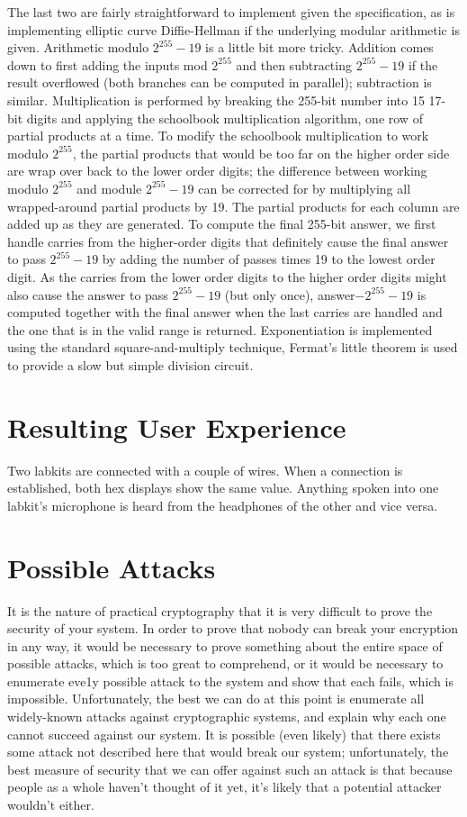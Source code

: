\documentclass[a4paper]{report}
\begin{document}
The last two are fairly straightforward to implement given the specification, as
is implementing elliptic curve Diffie-Hellman if the underlying modular
arithmetic is given. Arithmetic modulo $2^{255}-19$ is a little bit more
tricky. Addition comes down to first adding the inputs mod $2^{255}$ and then
subtracting $2^{255}-19$ if the result overflowed (both branches can be computed
in parallel); subtraction is similar.  Multiplication is performed by breaking
the 255-bit number into 15 17-bit digits and applying the schoolbook
multiplication algorithm, one row of partial products at a time. To modify the
schoolbook multiplication to work modulo $2^{255}$, the partial products that
would be too far on the higher order side are wrap over back to the lower order
digits; the difference between working modulo $2^{255}$ and module $2^{255}-19$
can be corrected for by multiplying all wrapped-around partial products by 19.
The partial products for each column are added up as they are generated. To
compute the final 255-bit answer, we first handle carries from the higher-order
digits that definitely cause the final answer to pass $2^{255}-19$ by adding the
number of passes times 19 to the lowest order digit. As the carries from the
lower order digits to the higher order digits might also cause the answer to
pass $2^{255}-19$ (but only once), answer$-2^{255}-19$ is computed together with
the final answer when the last carries are handled and the one that is in the
valid range is returned. Exponentiation is implemented using the standard
square-and-multiply technique, Fermat's little theorem is used to provide a slow
but simple division circuit.

\section{Resulting User Experience}

Two labkits are connected with a couple of wires. When a connection is
established, both hex displays show the same value. Anything spoken into one
labkit's microphone is heard from the headphones of the other and vice versa.

\section{Possible Attacks}

It is the nature of practical cryptography that it is very difficult to prove the security of your system. In order to prove that nobody can break your encryption in any way, it would be necessary to prove something about the entire space of possible attacks, which is too great to comprehend, or it would be necessary to enumerate eve1y possible attack to the system and show that each fails, which is impossible. Unfortunately, the best we can do at this point is enumerate all widely-known attacks against cryptographic systems, and explain why each one cannot succeed against our system. It is possible (even likely) that there exists some attack not described here that would break our system; unfortunately, the best measure of security that we can offer against such an attack is that because people as a whole haven't thought of it yet, it's likely that a potential attacker wouldn't either.
\end{document}
